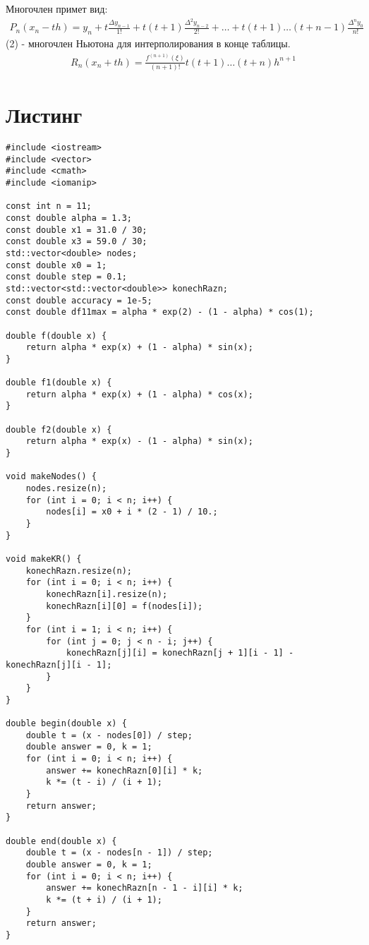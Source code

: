 \documentclass[10pt]{scrartcl}
\makeatletter
\newcommand{\verbatimfont}[1]{\renewcommand{\verbatim@font}{\ttfamily#1}}
\makeatother
\begin{document}
Многочлен примет вид:
\begin{gather}
P_n(x_n - th) = y_n + t\frac{\Delta y_{n - 1}}{1!} + t(t + 1)\frac{\Delta^2 y_{n - 2}}{2!} + \dots +
t(t + 1)\dots(t + n - 1)\frac{\Delta^n y_0}{n!}
\end{gather}
(2) - многочлен Ньютона для интерполирования в конце таблицы.
\begin{gather*}
R_n(x_n + th) = \frac{f^{(n + 1)}(\xi)}{(n + 1)!}t(t + 1)\dots(t + n)h^{n + 1}
\end{gather*}
\section*{Листинг}
\verbatimfont{\small}
\begin{verbatim}
#include <iostream>
#include <vector>
#include <cmath>
#include <iomanip>

const int n = 11;
const double alpha = 1.3;
const double x1 = 31.0 / 30;
const double x3 = 59.0 / 30;
std::vector<double> nodes;
const double x0 = 1;
const double step = 0.1;
std::vector<std::vector<double>> konechRazn;
const double accuracy = 1e-5;
const double df11max = alpha * exp(2) - (1 - alpha) * cos(1);

double f(double x) {
    return alpha * exp(x) + (1 - alpha) * sin(x);
}

double f1(double x) {
    return alpha * exp(x) + (1 - alpha) * cos(x);
}

double f2(double x) {
    return alpha * exp(x) - (1 - alpha) * sin(x);
}

void makeNodes() {
    nodes.resize(n);
    for (int i = 0; i < n; i++) {
        nodes[i] = x0 + i * (2 - 1) / 10.;
    }
}

void makeKR() {
    konechRazn.resize(n);
    for (int i = 0; i < n; i++) {
        konechRazn[i].resize(n);
        konechRazn[i][0] = f(nodes[i]);
    }
    for (int i = 1; i < n; i++) {
        for (int j = 0; j < n - i; j++) {
            konechRazn[j][i] = konechRazn[j + 1][i - 1] - konechRazn[j][i - 1];
        }
    }
}

double begin(double x) {
    double t = (x - nodes[0]) / step;
    double answer = 0, k = 1;
    for (int i = 0; i < n; i++) {
        answer += konechRazn[0][i] * k;
        k *= (t - i) / (i + 1);
    }
    return answer;
}

double end(double x) {
    double t = (x - nodes[n - 1]) / step;
    double answer = 0, k = 1;
    for (int i = 0; i < n; i++) {
        answer += konechRazn[n - 1 - i][i] * k;
        k *= (t + i) / (i + 1);
    }
    return answer;
}


\end{verbatim}
\end{document}
